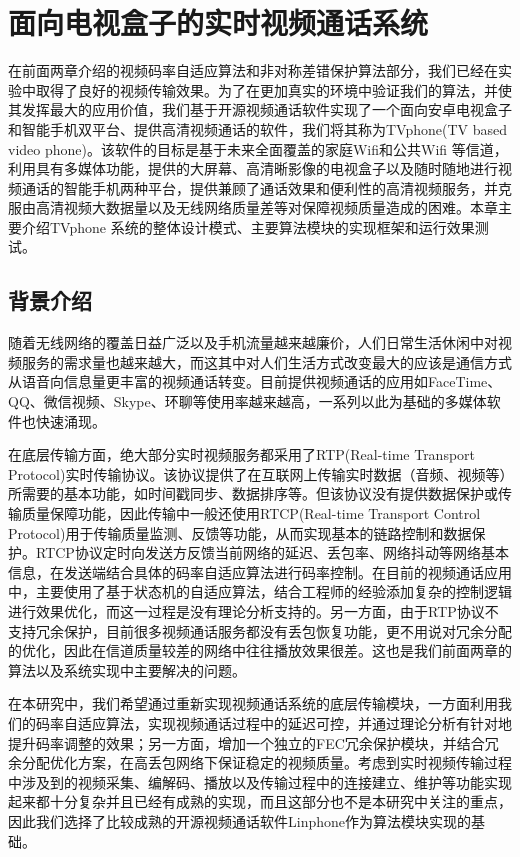 \chapter{面向电视盒子的实时视频通话系统}
\label{chap:system}
在前面两章介绍的视频码率自适应算法和非对称差错保护算法部分，我们已经在实验中取得了良好的视频传输效果。为了在更加真实的环境中验证我们的算法，并使其发挥最大的应用价值，我们基于开源视频通话软件实现了一个面向安卓电视盒子和智能手机双平台、提供高清视频通话的软件，我们将其称为TVphone(TV based video phone)。该软件的目标是基于未来全面覆盖的家庭Wifi和公共Wifi 等信道，利用具有多媒体功能，提供的大屏幕、高清晰影像的电视盒子以及随时随地进行视频通话的智能手机两种平台，提供兼顾了通话效果和便利性的高清视频服务，并克服由高清视频大数据量以及无线网络质量差等对保障视频质量造成的困难。本章主要介绍TVphone 系统的整体设计模式、主要算法模块的实现框架和运行效果测试。


\section{背景介绍}
随着无线网络的覆盖日益广泛以及手机流量越来越廉价，人们日常生活休闲中对视频服务的需求量也越来越大，而这其中对人们生活方式改变最大的应该是通信方式从语音向信息量更丰富的视频通话转变。目前提供视频通话的应用如FaceTime、QQ、微信视频、Skype、环聊等使用率越来越高，一系列以此为基础的多媒体软件也快速涌现。

在底层传输方面，绝大部分实时视频服务都采用了RTP(Real-time Transport Protocol)实时传输协议。该协议提供了在互联网上传输实时数据（音频、视频等）所需要的基本功能，如时间戳同步、数据排序等。但该协议没有提供数据保护或传输质量保障功能，因此传输中一般还使用RTCP(Real-time Transport Control Protocol)用于传输质量监测、反馈等功能，从而实现基本的链路控制和数据保护。RTCP协议定时向发送方反馈当前网络的延迟、丢包率、网络抖动等网络基本信息，在发送端结合具体的码率自适应算法进行码率控制。在目前的视频通话应用中，主要使用了基于状态机的自适应算法，结合工程师的经验添加复杂的控制逻辑进行效果优化，而这一过程是没有理论分析支持的。另一方面，由于RTP协议不支持冗余保护，目前很多视频通话服务都没有丢包恢复功能，更不用说对冗余分配的优化，因此在信道质量较差的网络中往往播放效果很差。这也是我们前面两章的算法以及系统实现中主要解决的问题。

在本研究中，我们希望通过重新实现视频通话系统的底层传输模块，一方面利用我们的码率自适应算法，实现视频通话过程中的延迟可控，并通过理论分析有针对地提升码率调整的效果；另一方面，增加一个独立的FEC冗余保护模块，并结合冗余分配优化方案，在高丢包网络下保证稳定的视频质量。考虑到实时视频传输过程中涉及到的视频采集、编解码、播放以及传输过程中的连接建立、维护等功能实现起来都十分复杂并且已经有成熟的实现，而且这部分也不是本研究中关注的重点，因此我们选择了比较成熟的开源视频通话软件Linphone\cite{website:linphone}作为算法模块实现的基础。


